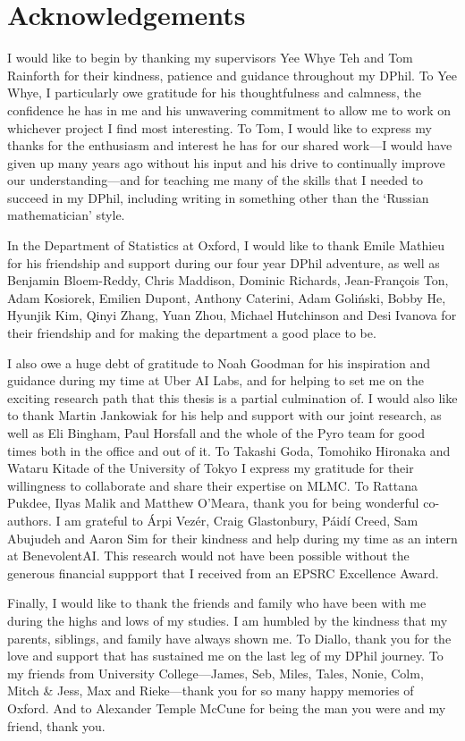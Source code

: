 \documentclass[a4paper, 10pt]{report}
\theoremstyle{plain}
\theoremstyle{definition}
\theoremstyle{remark}
\begin{document}
	
	\newpage
	\chapter*{Acknowledgements}
	I would like to begin by thanking my supervisors Yee Whye Teh and Tom Rainforth for their kindness, patience and guidance throughout my DPhil.
	To Yee Whye, I particularly owe gratitude for his thoughtfulness and calmness, the confidence he has in me and his unwavering commitment to allow me to work on whichever project I find most interesting.
	To Tom, I would like to express my thanks for the enthusiasm and interest he has for our shared work---I would have given up many years ago without his input and his drive to continually improve our understanding---and for teaching me many of the skills that I needed to succeed in my DPhil, including writing in something other than the `Russian mathematician' style.
	
	In the Department of Statistics at Oxford, I would like to thank Emile Mathieu for his friendship and support during our four year DPhil adventure, as well as Benjamin Bloem-Reddy, Chris Maddison, Dominic Richards, Jean-François Ton, Adam Kosiorek, Emilien Dupont, Anthony Caterini, Adam Goliński, Bobby He, Hyunjik Kim, Qinyi Zhang, Yuan Zhou, Michael Hutchinson and Desi Ivanova for their friendship and for making the department a good place to be.
	
	I also owe a huge debt of gratitude to Noah Goodman for his inspiration and guidance during my time at Uber AI Labs, and for helping to set me on the exciting research path that this thesis is a partial culmination of.
	I would also like to thank Martin Jankowiak for his help and support with our joint research, as well as Eli Bingham, Paul Horsfall and the whole of the Pyro team for good times both in the office and out of it.
	To Takashi Goda, Tomohiko Hironaka and Wataru Kitade of the University of Tokyo I express my gratitude for their willingness to collaborate and share their expertise on MLMC.
	To Rattana Pukdee, Ilyas Malik and Matthew O'Meara, thank you for being wonderful co-authors.
	I am grateful to Árpi Vezér, Craig Glastonbury, Páidí Creed, Sam Abujudeh and Aaron Sim for their kindness and help during my time as an intern at BenevolentAI.
	This research would not have been possible without the generous financial suppport that I received from an EPSRC Excellence Award.
	
	Finally, I would like to thank the friends and family who have been with me during the highs and lows of my studies.
	I am humbled by the kindness that my parents, siblings, and family have always shown me.
	To Diallo, thank you for the love and support that has sustained me on the last leg of my DPhil journey.
	To my friends from University College---James, Seb, Miles, Tales, Nonie, Colm, Mitch \& Jess, Max and Rieke---thank you for so many happy memories of Oxford.
	And to Alexander Temple McCune for being the man you were and my friend, thank you.
	
\end{document}
